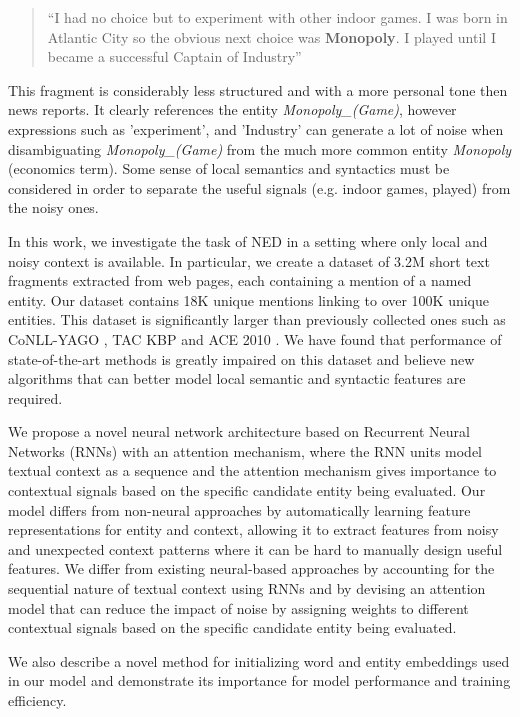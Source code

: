 \documentclass[11pt]{article}
\begin{document}
\begin{quote}
	``I had no choice but to experiment with other indoor games. I was born in Atlantic City so the obvious next choice was \textbf{Monopoly}. I played until I became a successful Captain of Industry''
\end{quote}

This fragment is considerably less structured and with a more personal tone then news reports. It clearly references the entity \textit{Monopoly\_(Game)}, however expressions such as 'experiment', and 'Industry' can generate a lot of noise when disambiguating \textit{Monopoly\_(Game)} from the much more common entity \textit{Monopoly} (economics term). Some sense of local semantics and syntactics must be considered in order to separate the useful signals (e.g. indoor games, played) from the noisy ones.

In this work, we investigate the task of NED in a setting where only local and noisy context is available. In particular, we create a dataset of 3.2M short text fragments extracted from web pages, each containing a mention of a named entity. Our dataset contains 18K unique mentions linking to over 100K unique entities. This dataset is significantly larger than previously collected ones such as CoNLL-YAGO \cite{hoffart2011robust}, TAC KBP \cite{ji2010overview} and ACE 2010 \cite{bentivogli2010extending}. We have found that performance of state-of-the-art methods is greatly impaired on this dataset and believe new algorithms that can better model local semantic and syntactic features are required.

We propose a novel neural network architecture based on Recurrent Neural Networks (RNNs) with an attention mechanism, where the RNN units model textual context as a sequence and the attention mechanism gives importance to contextual signals based on the specific candidate entity being evaluated. Our model differs from non-neural approaches by automatically learning feature representations for entity and context, allowing it to extract features from noisy and unexpected context patterns where it can be hard to manually design useful features. We differ from existing neural-based approaches by accounting for the sequential nature of textual context using RNNs and by devising an attention model that can reduce the impact of noise by assigning weights to different contextual signals based on the specific candidate entity being evaluated.

We also describe a novel method for initializing word and entity embeddings used in our model and demonstrate its importance for model performance and training efficiency. 
\end{document}
